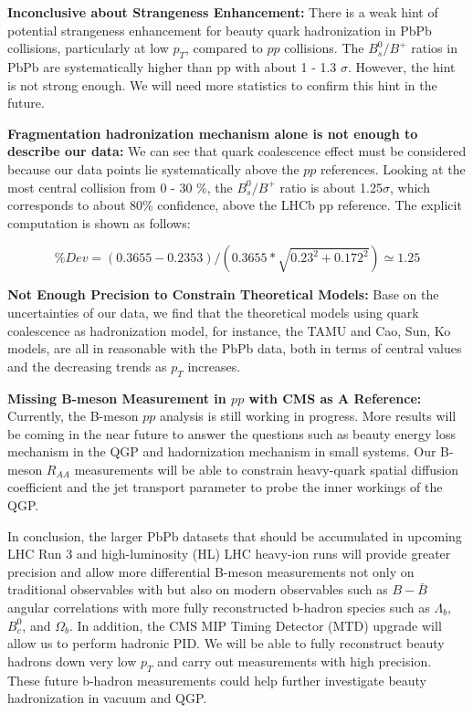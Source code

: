 \textbf{Inconclusive about Strangeness Enhancement:} There is a weak hint of potential strangeness enhancement for beauty quark hadronization in PbPb collisions, particularly at low $p_T$, compared to $pp$ collisions. The $B^0_s/B^+$ ratios in PbPb are systematically higher than pp with about 1 - 1.3 $\sigma$. However, the hint is not strong enough. We will need more statistics to confirm this hint in the future.

\textbf{Fragmentation hadronization mechanism alone is not enough to describe our data:} We can see that quark coalescence effect must be considered because our data points lie systematically above the $pp$ references. Looking at the most central collision from 0 - 30 \%, the $B^0_s/B^+$ ratio is about 1.25$\sigma$, which corresponds to about 80\% confidence, above the LHCb pp reference. The explicit computation is shown as follows:

\begin{equation}
\% Dev = (0.3655 - 0.2353)/(0.3655 * \sqrt{0.23^2 + 0.172^2}) \simeq 1.25 
\end{equation}


\textbf{Not Enough Precision to Constrain Theoretical Models:} Base on the uncertainties of our data, we find that the theoretical models using quark coalescence as hadronization model, for instance, the TAMU and Cao, Sun, Ko models, are all in reasonable with the PbPb data, both in terms of central values and the decreasing trends as $p_T$ increases.

\textbf{Missing B-meson Measurement in $pp$ with CMS as A Reference:} Currently, the B-meson $pp$ analysis is still working in progress. More results will be coming in the near future to answer the questions such as beauty energy loss mechanism in the QGP and hadornization mechanism in small systems. Our B-meson $R_{AA}$ measurements will be able to constrain heavy-quark spatial diffusion coefficient and the jet transport parameter to probe the inner workings of the QGP.

In conclusion, the larger PbPb datasets that should be accumulated in upcoming LHC Run 3 and high-luminosity (HL) LHC heavy-ion runs will provide greater precision and allow more differential B-meson measurements not only on traditional observables with but also on modern observables such as $B-\bar B$ angular correlations with more fully reconstructed b-hadron species such as $\Lambda_b$, $B^0_c$, and $\Omega_b$. In addition, the CMS MIP Timing Detector (MTD) upgrade \cite{CMSMTD} will allow us to perform hadronic PID. We will be able to fully reconstruct beauty hadrons down very low $p_T$ and carry out measurements with high precision. These future b-hadron measurements could help further investigate beauty hadronization in vacuum and QGP.


